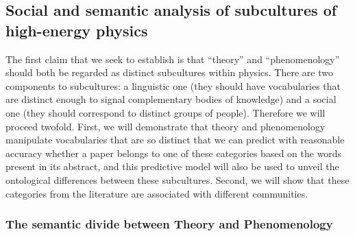 \documentclass[smallextended]{svjour3}
\begin{document}
\subsection{Social and semantic analysis of subcultures of high-energy physics}\label{section:method_subcultures}

The first claim that we seek to establish is that ``theory'' and ``phenomenology'' should both be regarded as distinct subcultures within physics. There are two components to subcultures: a linguistic one (they should have vocabularies that are distinct enough to signal complementary bodies of knowledge) and a social one (they should correspond to distinct groups of people). Therefore we will proceed twofold. First, we will demonstrate that theory and phenomenology manipulate vocabularies that are so distinct that we can predict with reasonable accuracy whether a paper belongs to one of these categories based on the words present in its abstract, and this predictive model will also be used to unveil the ontological differences between these subcultures. Second, we will show that these categories from the literature are associated with different communities.

\subsubsection{The semantic divide between Theory and Phenomenology}
\end{document}
